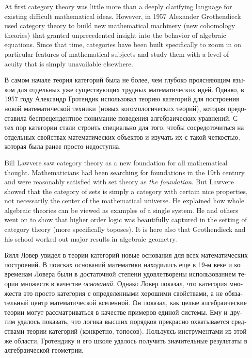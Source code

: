 \documentclass[a4paper]{book}
\theoremstyle{myth}
\begin{document}
\begin{russian}
At first category theory was little more than a deeply clarifying language for existing difficult mathematical ideas. However, in 1957 Alexander Grothendieck used category theory to build new mathematical machinery (new cohomology theories) that granted unprecedented insight into the behavior of algebraic equations. Since that time, categories have been built specifically to zoom in on particular features of mathematical subjects and study them with a level of acuity that is simply unavailable elsewhere.

В самом начале теория категорий была не более, чем глубоко проясняющим языком для отдельных уже существующих трудных математических идей. Однако, в 1957 году Александр Гротендик использовал теорию категорий для построения новой математической техники (новых когомологических теорий), которая предоставила беспрецендентное понимание поведения алгебраических уравнений. С тех пор категории стали строить специально для того, чтобы сосредоточиться на отдельных свойствах математических объектов и изучать их с такой четкостью, которая была ранее просто недоступна. 

Bill Lawvere saw category theory as a new foundation for all mathematical thought. Mathematicians had been searching for foundations in the 19th century and were reasonably satisfied with set theory as {\em the foundation}. But Lawvere showed that the category of sets is simply a category with certain nice properties, not necessarily the center of the mathematical universe. He explained how whole algebraic theories can be viewed as examples of a single system. He and others went on to show that higher order logic was beautifully captured in the setting of category theory (more specifically toposes). It is here also that Grothendieck and his school worked out major results in algebraic geometry.

Билл Ловер увидел в теории категорий новые основания для всех математических построений. В поисках оснований математики находились еще в 19-м веке и ко временам Ловера были в достаточной степени удовлетворены использованием теории множеств в качестве {\em оснований}. Однако Ловер показал, что категория множеств это просто категория с определенными хорошими свойствами, а не обязательный центр математической вселенной. Он показал, как целые алгебраические теории могут рассматриваться в качестве примеров единой системы. Ему и другим удалось показать, что логика высших порядков прекрасно охватывается средствами теории категорий (конкретно, топосов). Пользуясь инструментами из этой же области, Гротендику и его школе удалось получить значительные результаты в алгебраической геометрии. 


\end{russian}
\end{document}
